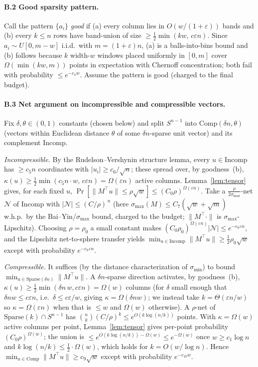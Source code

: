 \documentclass[11pt]{article}
\newcommand{\norm}[1]{\lVert #1 \rVert}
\newcommand{\sigmin}{\sigma_{\min}}
\theoremstyle{plain}
\theoremstyle{definition}
\begin{document}
\paragraph{B.2 Good sparsity pattern.}
Call the pattern $\{a_i\}$ \emph{good} if (a) every column lies in $O(w/(1+\varepsilon))$ bands
and (b) every $k\le n$ rows have band-union of size $\ge \tfrac12\min(kw,\,c\varepsilon n)$.
Since $a_i\sim U[0,m-w]$ i.i.d.\ with $m=(1+\varepsilon)n$, (a) is a balls-into-bins bound and
(b) follows because $k$ width-$w$ windows placed uniformly in $[0,m]$ cover
$\Omega(\min(kw,m))$ points in expectation with Chernoff concentration; both fail with
probability $\le e^{-c_4 w}$. Assume the pattern is good (charged to the final budget).

\paragraph{B.3 Net argument on incompressible and compressible vectors.}
Fix $\delta,\theta\in(0,1)$ constants (chosen below) and split $S^{n-1}$ into
$\mathrm{Comp}(\delta n,\theta)$ (vectors within Euclidean distance $\theta$ of some
$\delta n$-sparse unit vector) and its complement $\mathrm{Incomp}$.

\emph{Incompressible.} By the Rudelson--Vershynin structure lemma, every
$u\in\mathrm{Incomp}$ has $\ge c_5 n$ coordinates with $|u_i|\ge c_6/\sqrt n$; these spread
over, by goodness~(b), $\kappa(u)\ge \tfrac12\min(c_5 n\cdot w,\,c\varepsilon n)=\Omega(\varepsilon n)$
active columns. Lemma~\ref{lem:tensor} gives, for each fixed $u$,
$\Pr[\norm{M^\top u}\le\rho\sqrt w]\le (C_0\rho)^{\Omega(\varepsilon n)}$. Take a
$\tfrac{\rho}{2\sigma_{\max}}$-net $\mathcal N$ of $\mathrm{Incomp}$ with
$|\mathcal N|\le (C/\rho)^{\,n}$ (here $\sigma_{\max}(M)\le C_7(\sqrt w+\sqrt m)$ w.h.p.\ by
the Bai--Yin/$\sigma_{\max}$ bound, charged to the budget; $\norm{M^\top\cdot}$ is
$\sigma_{\max}$-Lipschitz). Choosing $\rho=\rho_0$ a small constant makes
$(C_0\rho_0)^{\Omega(\varepsilon n)}|\mathcal N|\le e^{-c_8\varepsilon n}$, and the Lipschitz
net-to-sphere transfer yields $\min_{u\in\mathrm{Incomp}}\norm{M^\top u}\ge \tfrac12\rho_0\sqrt w$
except with probability $e^{-c_8\varepsilon n}$.

\emph{Compressible.} It suffices (by the distance characterization of $\sigmin$) to bound
$\min_{u\in\mathrm{Sparse}(\delta n)}\norm{M^\top u}$. A $\delta n$-sparse direction activates,
by goodness~(b), $\kappa(u)\ge \tfrac12\min(\delta n\, w, c\varepsilon n)=\Omega(w)$ columns
(for $\delta$ small enough that $\delta n w\le c\varepsilon n$, i.e.\ $\delta\le c\varepsilon/w$,
giving $\kappa=\Omega(\delta n w)$; we instead take $k=\Theta(\varepsilon n/w)$ so
$\kappa=\Omega(\varepsilon n)$ when that is $\le w$ and $\Omega(w)$ otherwise). A
$\rho$-net of $\mathrm{Sparse}(k)\cap S^{n-1}$ has $\binom{n}{k}(C/\rho)^k\le
e^{O(k\log(n/k))}$ points. With $\kappa=\Omega(w)$ active columns per point,
Lemma~\ref{lem:tensor} gives per-point probability $(C_0\rho)^{\Omega(w)}$; the union is
$\le e^{O(k\log(n/k))-\Omega(w)}\le e^{-\Omega(w)}$ once $w\ge c_1\log n$ and $k\log(n/k)\le
\tfrac12\cdot\Omega(w)$, which holds for $k=O(w/\log n)$. Hence
$\min_{u\in\mathrm{Comp}}\norm{M^\top u}\ge c_9\sqrt w$ except with probability $e^{-c_{10}w}$.
\end{document}
